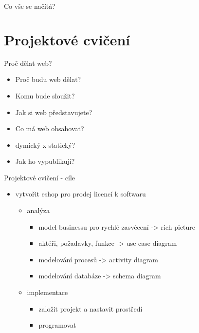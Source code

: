 \documentclass{beamer}
\begin{document}
\begin{frame}{Co vše se načítá?}
\end{frame}


\section{Projektové cvičení}

\begin{frame}{Proč dělat web?}
	\begin{itemize}
		\item Proč budu web dělat? 
		\item Komu bude sloužit?
		\item Jak si web představujete?
		\item Co má web obsahovat?
		\item dymický x statický?
		\item Jak ho vypublikuji?
	\end{itemize}
\end{frame}

\begin{frame}{Projektové cvičení - cíle}
	\begin{itemize}
		\item vytvořit eshop pro prodej licencí k softwaru
		\begin{itemize}
			\item analýza
			\begin{itemize}
				\item model businessu pro rychlé zasvěcení -> rich picture
				\item aktéři, požadavky, funkce -> use case diagram
				\item modelování procesů -> activity diagram
				\item modelování databáze -> schema diagram
			\end{itemize}
			\item implementace
			\begin{itemize}
				\item založit projekt a nastavit prostředí
				\item programovat
			\end{itemize}
			
		\end{itemize}
	\end{itemize}
\end{frame}
\end{document}
